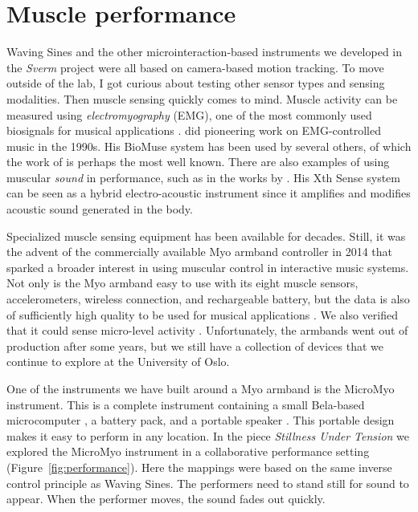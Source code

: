 \section{Muscle performance}\label{sec:muscles}

Waving Sines and the other microinteraction-based instruments we developed in the \emph{Sverm} project were all based on camera-based motion tracking. To move outside of the lab, I got curious about testing other sensor types and sensing modalities. Then muscle sensing quickly comes to mind. Muscle activity can be measured using \emph{electromyography} (EMG), one of the most commonly used biosignals for musical applications \citep{aly_appropriating_2021}. \citet{knapp_bioelectric_1990} did pioneering work on EMG-controlled music in the 1990s. His BioMuse system has been used by several others, of which the work of \citep{tanaka_musical_1993} is perhaps the most well known. There are also examples of using muscular \emph{sound} in performance, such as in the works by \citet{donnarumma_configuring_2016}. His Xth Sense system can be seen as a hybrid electro-acoustic instrument since it amplifies and modifies acoustic sound generated in the body.

Specialized muscle sensing equipment has been available for decades. Still, it was the advent of the commercially available Myo armband controller in 2014 that sparked a broader interest in using muscular control in interactive music systems. Not only is the Myo armband easy to use with its eight muscle sensors, accelerometers, wireless connection, and rechargeable battery, but the data is also of sufficiently high quality to be used for musical applications \citep{nymoen_mumyo_2015}. We also verified that it could sense micro-level activity \citep{jensenius_Exploring_2017a}. Unfortunately, the armbands went out of production after some years, but we still have a collection of devices that we continue to explore at the University of Oslo.

One of the instruments we have built around a Myo armband is the MicroMyo instrument. This is a complete instrument containing a small Bela-based microcomputer \citep{mcpherson_environment_2015}, a battery pack, and a portable speaker \citep{martin_composing_2018}. This portable design makes it easy to perform in any location. In the piece \emph{Stillness Under Tension} we explored the MicroMyo instrument in a collaborative performance setting (Figure~\ref{fig:performance}). Here the mappings were based on the same inverse control principle as Waving Sines. The performers need to stand still for sound to appear. When the performer moves, the sound fades out quickly.

